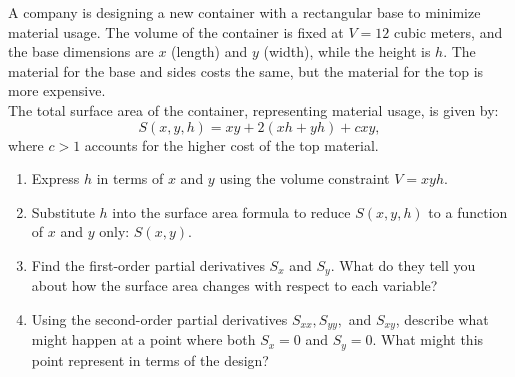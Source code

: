 \exampleline
\begin{example}
A company is designing a new container with a rectangular base to minimize material usage. The volume of the container is fixed at \( V = 12 \) cubic meters, and the base dimensions are \( x \) (length) and \( y \) (width), while the height is \( h \). The material for the base and sides costs the same, but the material for the top is more expensive. \\ 

\noindent The total surface area of the container, representing material usage, is given by:
\[
S(x, y, h) = xy + 2(xh + yh) + cxy,
\]
where \( c > 1 \) accounts for the higher cost of the top material.

\begin{enumerate}
    \item Express \( h \) in terms of \( x \) and \( y \) using the volume constraint \( V = x y h \).
    \item Substitute \( h \) into the surface area formula to reduce \( S(x, y, h) \) to a function of \( x \) and \( y \) only: \( S(x, y) \).
    \item Find the first-order partial derivatives \( S_x \) and \( S_y \). What do they tell you about how the surface area changes with respect to each variable?
    \item Using the second-order partial derivatives \( S_{xx}, S_{yy}, \) and \( S_{xy} \), describe what might happen at a point where both \( S_x = 0 \) and \( S_y = 0 \). What might this point represent in terms of the design?
\end{enumerate}
\end{example}

